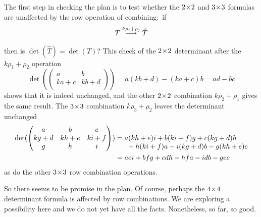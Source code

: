 The first step in checking the plan is to test whether   
the $2 \! \times \! 2$ and $3 \! \times \! 3$ formulas are unaffected by the 
row operation of combining:~if 
\begin{equation*}
   T \mathrel{ \mathop{\longrightarrow}\limits^{k\rho_i+\rho_j\mathstrut}_{ \begin{subarray}{l} \relax \end{subarray}}} \hat{T}
\end{equation*}
then is \( \det(\hat{T})=\det(T) \)? 
This check of the $2 \! \times \! 2$ determinant after the $k\rho_1+\rho_2$ operation
\begin{equation*}
   \det(
       \begin{pmatrix}
         a     &b       \\
         ka+c  &kb+d    \\
      \end{pmatrix}
   )
   = a(kb+d)-(ka+c)b = ad-bc
\end{equation*}
shows that it is indeed unchanged, and
the other $2 \! \times \! 2$ combination $k\rho_2+\rho_1$ gives the same result.
The $3 \! \times \! 3$ combination $k\rho_3+\rho_2$ leaves the determinant unchanged
  \begin{align*}
    \det(
      \begin{pmatrix}
         a    &b    &c    \\
         kg+d &kh+e &ki+f \\
         g    &h    &i
      \end{pmatrix}
    )
    &=\begin{array}[t]{@{}l@{}}
         a(kh+e)i+b(ki+f)g+c(kg+d)h \\
         \ \hbox{}-h(ki+f)a-i(kg+d)b-g(kh+e)c  
    \end{array}                                 \\
     &=aei + bfg + cdh - hfa - idb - gec
  \end{align*}
as do the other $3 \! \times \! 3$ row combination operations.

So there seems to be promise in the plan.
Of course, perhaps
the $4 \! \times \! 4$ determinant formula is affected by row combinations.
We are exploring a possibility here and we do not yet have all the facts.
Nonetheless, so far, so good.

